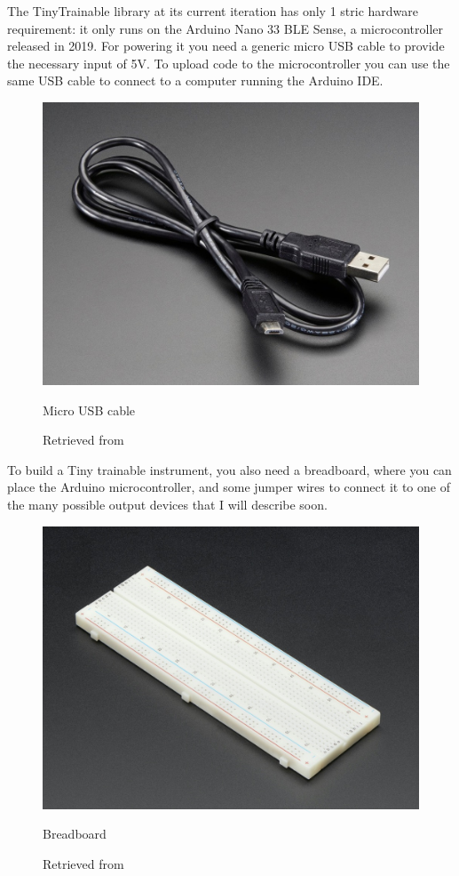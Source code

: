 The TinyTrainable library at its current iteration has only 1 stric hardware requirement: it only runs on the Arduino Nano 33 \acrshort{BLE} Sense, a microcontroller released in 2019. For powering it you need a generic micro USB cable to provide the necessary input of 5V. To upload code to the microcontroller you can use the same USB cable to connect to a computer running the Arduino IDE.

\begin{figure}[ht]
  \centering
  \includegraphics[width=0.75\linewidth,height=0.25\textheight,keepaspectratio]{images/materials-adafruit-micro-usb-cable.jpg}
  \caption{Micro USB cable}
  \caption*{Retrieved from \cite{website-materials-adafruit-micro-usb-cable}}
  \label{fig:materials-adafruit-usb-cable}
\end{figure}

To build a Tiny trainable instrument, you also need a breadboard, where you can place the Arduino microcontroller, and some jumper wires to connect it to one of the many possible output devices that I will describe soon.

\begin{figure}[ht]
  \centering
  \includegraphics[width=0.75\linewidth,height=0.25\textheight,keepaspectratio]{images/materials-adafruit-breadboard.jpg}
  \caption{Breadboard}
  \caption*{Retrieved from \cite{website-materials-adafruit-breadboard}}
  \label{fig:materials-adafruit-breadboard}
\end{figure}

